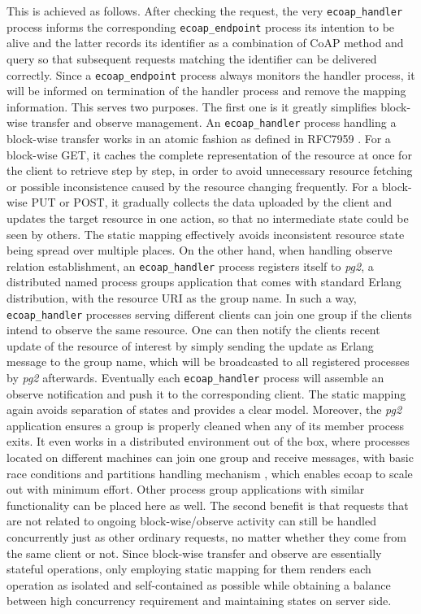 This is achieved as follows. After checking the request, the very \verb|ecoap_handler| process informs the corresponding \verb|ecoap_endpoint| process its intention to be alive and the latter records its identifier as a combination of CoAP method and query so that subsequent requests matching the identifier can be delivered correctly. Since a \verb|ecoap_endpoint| process always monitors the handler process, it will be informed on termination of the handler process and remove the mapping information. This serves two purposes. The first one is it greatly simplifies block-wise transfer and observe management. An \verb|ecoap_handler| process handling a block-wise transfer works in an atomic fashion as defined in RFC7959 \autocite{blockwise}. For a block-wise GET, it caches the complete representation of the resource at once for the client to retrieve step by step, in order to avoid unnecessary resource fetching or possible inconsistence caused by the resource changing frequently. For a block-wise PUT or POST,  it gradually collects the data uploaded by the client and updates the target resource in one action, so that no intermediate state could be seen by others. The static mapping effectively avoids inconsistent resource state being spread over multiple places. On the other hand, when handling observe relation establishment, an \verb|ecoap_handler| process registers itself to \textit{pg2}, a distributed named process groups application that comes with standard Erlang distribution, with the resource URI as the group name. In such a way, \verb|ecoap_handler| processes serving different clients can join one group if the clients intend to observe the same resource. One can then notify the clients recent update of the resource of interest by simply sending the update as Erlang message to the group name, which will be broadcasted to all registered processes by \textit{pg2} afterwards. Eventually each \verb|ecoap_handler| process will assemble an observe notification and push it to the corresponding client. The static mapping again avoids separation of states and provides a clear model. Moreover, the \textit{pg2} application ensures a group is properly cleaned when any of its member process exits. It even works in a distributed environment out of the box, where processes located on different machines can join one group and receive messages, with basic race conditions and partitions handling mechanism \autocite{pg2_failure}, which enables ecoap to scale out with minimum effort. Other process group applications with similar functionality can be placed here as well. The second benefit is that requests that are not related to ongoing block-wise/observe activity can still be handled concurrently just as other ordinary requests, no matter whether they come from the same client or not. Since block-wise transfer and observe are essentially stateful operations, only employing static mapping for them renders each operation as isolated and self-contained as possible while obtaining a balance between high concurrency requirement and maintaining states on server side.

